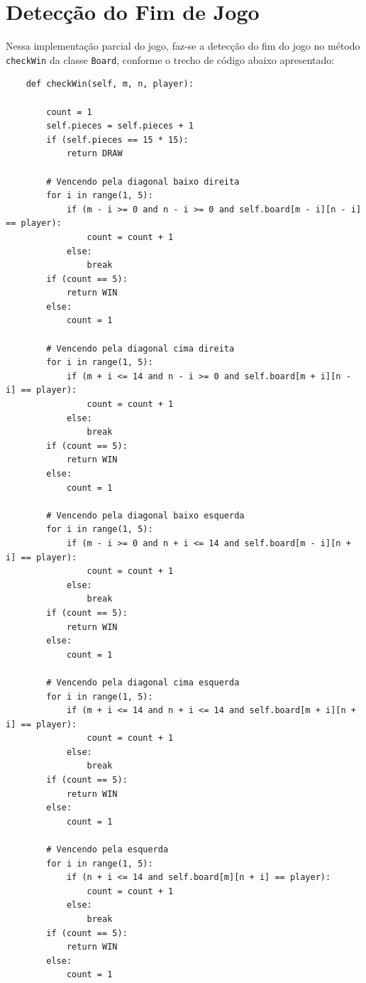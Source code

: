 \documentclass[10pt,a4paper]{article}
\begin{document}

\section{Detecção do Fim de Jogo} \label{sec:fim_de_jogo}

Nessa implementação parcial do jogo, faz-se a detecção do fim do jogo no método \texttt{checkWin} da classe \texttt{Board}, conforme o trecho de código abaixo apresentado:

\begin{verbatim}
    def checkWin(self, m, n, player):

        count = 1
        self.pieces = self.pieces + 1
        if (self.pieces == 15 * 15):
            return DRAW

        # Vencendo pela diagonal baixo direita
        for i in range(1, 5):
            if (m - i >= 0 and n - i >= 0 and self.board[m - i][n - i] == player):
                count = count + 1
            else:
                break
        if (count == 5):
            return WIN
        else:
            count = 1

        # Vencendo pela diagonal cima direita
        for i in range(1, 5):
            if (m + i <= 14 and n - i >= 0 and self.board[m + i][n - i] == player):
                count = count + 1
            else:
                break
        if (count == 5):
            return WIN
        else:
            count = 1

        # Vencendo pela diagonal baixo esquerda
        for i in range(1, 5):
            if (m - i >= 0 and n + i <= 14 and self.board[m - i][n + i] == player):
                count = count + 1
            else:
                break
        if (count == 5):
            return WIN
        else:
            count = 1

        # Vencendo pela diagonal cima esquerda
        for i in range(1, 5):
            if (m + i <= 14 and n + i <= 14 and self.board[m + i][n + i] == player):
                count = count + 1
            else:
                break
        if (count == 5):
            return WIN
        else:
            count = 1

        # Vencendo pela esquerda
        for i in range(1, 5):
            if (n + i <= 14 and self.board[m][n + i] == player):
                count = count + 1
            else:
                break
        if (count == 5):
            return WIN
        else:
            count = 1


\end{verbatim}
\end{document}
